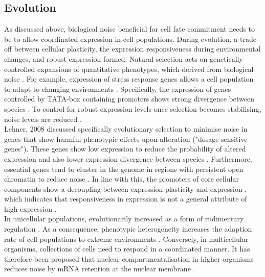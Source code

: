 \subsection{Evolution}

As discussed above, biological noise  beneficial for cell fate commitment  needs to be  to allow coordinated expression in cell populations. 
During evolution, a trade-off between cellular plasticity, the expression responsiveness during environmental changes, and robust expression formed. 
Natural selection acts on genetically controlled expansions of quantitative phenotypes, which derived from biological noise \citep{Eldar2010}. 
For example,  expression of stress response genes allows a cell population to adapt to changing environments \citep{Lopez-Maury2009}. 
Specifically, the expression of genes controlled by TATA-box containing promoters shows strong divergence between species \citep{Tirosh2006}. 
To control for robust expression levels once selection becomes stabilising, noise levels are reduced \citep{Lopez-Maury2009, Eldar2010, Pires2016}. \\

Lehner, 2008 discussed specifically evolutionary selection to minimise noise in genes that show harmful phenotypic effects upon alteration ("dosage-sensitive genes"). 
These genes show low expression  to reduce the probability of altered expression and also lower expression divergence between species \citep{Lehner2008}. 
Furthermore, essential genes tend to cluster in the genome in regions with persistent open chromatin to reduce  noise \citep{Batada2007}. 
In line with this, the promoters of core cellular components show a decoupling between expression plasticity and expression , which indicates that responsiveness in expression is not a general attribute of high expression  \citep{Lehner2010a}. \\

In unicellular populations,  evolutionarily increased as a form of rudimentary regulation \citep{Wolf2015}. 
As a consequence, phenotypic heterogeneity increases the adaption rate of cell populations to extreme environments \cite{Bodi2017}. 
Conversely, in multicellular organisms, collections of cells need to respond in a coordinated manner. 
It has therefore been proposed that nuclear compartmentalisation in higher organisms reduces noise by mRNA retention at the nuclear membrane \citep{Battich2013, Stoeger2016}.

